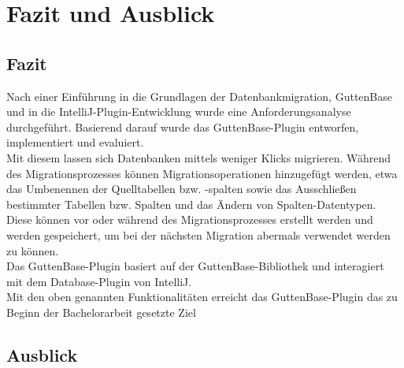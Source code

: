 \chapter{Fazit und Ausblick}
\label{sec:fazit}
\section{Fazit}

Nach einer Einführung in die Grundlagen der Datenbankmigration, GuttenBase und in die IntelliJ-Plugin-Entwicklung wurde eine Anforderungsanalyse durchgeführt. Basierend darauf wurde das GuttenBase-Plugin entworfen, implementiert und evaluiert.\\
Mit diesem lassen sich Datenbanken mittels weniger Klicks migrieren. Während des Migrationsprozesses können Migrationsoperationen hinzugefügt werden, etwa das Umbenennen der Quelltabellen bzw. -spalten sowie das Ausschließen bestimmter Tabellen bzw. Spalten und das Ändern von Spalten-Datentypen. Diese können vor oder während des Migrationsprozesses erstellt werden und werden gespeichert, um bei der nächsten Migration abermals verwendet werden zu können. \\ Das GuttenBase-Plugin basiert auf der GuttenBase-Bibliothek und interagiert mit dem Database-Plugin von IntelliJ.\\
Mit den oben genannten Funktionalitäten erreicht das GuttenBase-Plugin das zu Beginn der Bachelorarbeit gesetzte Ziel

\section{Ausblick}

